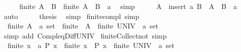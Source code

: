 \begin{isabellebody}
%
\isadelimproof
%
\endisadelimproof
%
\isatagproof
{}\isamarkupfalse%
\ {\isacharminus}{\kern0pt}\isanewline
\ \ \isamarkupfalse%
\ {\isachardoublequoteopen}finite\ {\isacharparenleft}{\kern0pt}A\ {\isacharminus}{\kern0pt}\ B{\isacharparenright}{\kern0pt}\ {\isasymlongleftrightarrow}\ finite\ {\isacharparenleft}{\kern0pt}A\ {\isacharminus}{\kern0pt}\ B\ {\isacharminus}{\kern0pt}\ {\isacharbraceleft}{\kern0pt}a{\isacharbraceright}{\kern0pt}{\isacharparenright}{\kern0pt}{\isachardoublequoteclose}\ \isamarkupfalse%
\ simp\isanewline
\ \ \isamarkupfalse%
\ \isamarkupfalse%
\ {\isachardoublequoteopen}A\ {\isacharminus}{\kern0pt}\ insert\ a\ B\ {\isacharequal}{\kern0pt}\ A\ {\isacharminus}{\kern0pt}\ B\ {\isacharminus}{\kern0pt}\ {\isacharbraceleft}{\kern0pt}a{\isacharbraceright}{\kern0pt}{\isachardoublequoteclose}\ \isamarkupfalse%
\ auto\isanewline
\ \ \isamarkupfalse%
\ \isamarkupfalse%
\ {\isacharquery}{\kern0pt}thesis\ \isamarkupfalse%
\ simp\isanewline
{}\isamarkupfalse%
%
\endisatagproof
{\isafoldproof}%
%
\isadelimproof
\isanewline
%
\endisadelimproof
\isanewline
{}\isamarkupfalse%
\ finite{\isacharunderscore}{\kern0pt}compl\ {\isacharbrackleft}{\kern0pt}simp{\isacharbrackright}{\kern0pt}{\isacharcolon}{\kern0pt}\isanewline
\ \ {\isachardoublequoteopen}finite\ {\isacharparenleft}{\kern0pt}A\ {\isacharcolon}{\kern0pt}{\isacharcolon}{\kern0pt}\ {\isacharprime}{\kern0pt}a\ set{\isacharparenright}{\kern0pt}\ {\isasymLongrightarrow}\ finite\ {\isacharparenleft}{\kern0pt}{\isacharminus}{\kern0pt}\ A{\isacharparenright}{\kern0pt}\ {\isasymlongleftrightarrow}\ finite\ {\isacharparenleft}{\kern0pt}UNIV\ {\isacharcolon}{\kern0pt}{\isacharcolon}{\kern0pt}\ {\isacharprime}{\kern0pt}a\ set{\isacharparenright}{\kern0pt}{\isachardoublequoteclose}\isanewline
%
\isadelimproof
\ \ %
\endisadelimproof
%
\isatagproof
{}\isamarkupfalse%
\ {\isacharparenleft}{\kern0pt}simp\ add{\isacharcolon}{\kern0pt}\ Compl{\isacharunderscore}{\kern0pt}eq{\isacharunderscore}{\kern0pt}Diff{\isacharunderscore}{\kern0pt}UNIV{\isacharparenright}{\kern0pt}%
\endisatagproof
{\isafoldproof}%
%
\isadelimproof
\isanewline
%
\endisadelimproof
\isanewline
{}\isamarkupfalse%
\ finite{\isacharunderscore}{\kern0pt}Collect{\isacharunderscore}{\kern0pt}not\ {\isacharbrackleft}{\kern0pt}simp{\isacharbrackright}{\kern0pt}{\isacharcolon}{\kern0pt}\isanewline
\ \ {\isachardoublequoteopen}finite\ {\isacharbraceleft}{\kern0pt}x\ {\isacharcolon}{\kern0pt}{\isacharcolon}{\kern0pt}\ {\isacharprime}{\kern0pt}a{\isachardot}{\kern0pt}\ P\ x{\isacharbraceright}{\kern0pt}\ {\isasymLongrightarrow}\ finite\ {\isacharbraceleft}{\kern0pt}x{\isachardot}{\kern0pt}\ {\isasymnot}\ P\ x{\isacharbraceright}{\kern0pt}\ {\isasymlongleftrightarrow}\ finite\ {\isacharparenleft}{\kern0pt}UNIV\ {\isacharcolon}{\kern0pt}{\isacharcolon}{\kern0pt}\ {\isacharprime}{\kern0pt}a\ set{\isacharparenright}{\kern0pt}{\isachardoublequoteclose}\isanewline

\end{isabellebody}
